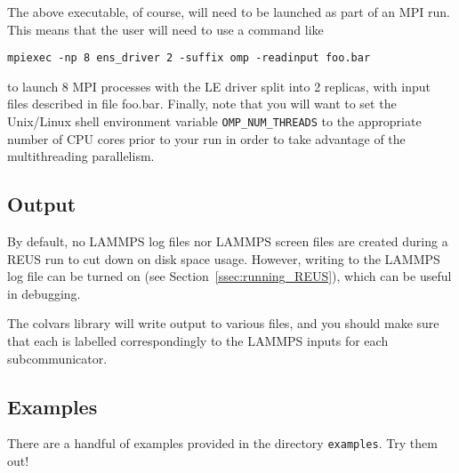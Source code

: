 \documentclass[10pt]{article}
\begin{document}
The above executable, of course, will need to be launched as part of an MPI run. This means
that the user will need to use a command like
\begin{verbatim}
mpiexec -np 8 ens_driver 2 -suffix omp -readinput foo.bar
\end{verbatim}
to launch 8 MPI processes with the LE driver split into 2 replicas, 
with input files described in file foo.bar.
Finally, note that you will want to
set the Unix/Linux shell environment variable \texttt{OMP\_NUM\_THREADS} to the appropriate
number of CPU cores prior to your run in order to take advantage of the multithreading parallelism. 



\subsection{Output}

By default, no LAMMPS log files nor LAMMPS screen files are created during a REUS 
run to cut down on disk space usage. However, writing to the LAMMPS log file can 
be turned on (see Section~\ref{ssec:running_REUS}), which can be useful in debugging.

The colvars library will write output to various files, and you should make sure
that each is labelled correspondingly to the LAMMPS inputs for each subcommunicator.

\subsection{Examples}

There are a handful of examples provided in the directory \texttt{examples}. Try them out!
\end{document}
